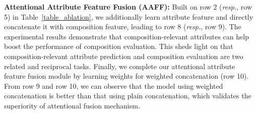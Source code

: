 \documentclass{bmvc2k}
\begin{document}
\noindent\textbf{Attentional Attribute Feature Fusion (AAFF):} Built on row 2 (\emph{resp.}, row 5) in Table~\ref{table_ablation}, we additionally learn attribute feature and directly concatenate it with composition feature, leading to  row 8 (\emph{resp.}, row 9). The experimental results demonstrate that composition-relevant attributes can help boost the performance of composition evaluation. This sheds light on that composition-relevant attribute prediction and composition evaluation are two related and reciprocal tasks. 
Finally, we complete our attentional attribute feature fusion module by learning weights for weighted concatenation (row 10). 
From row 9 and row 10, we can observe that the model using weighted concatenation is better than that using plain concatenation, which validates the superiority of attentional fusion mechanism.
\end{document}
